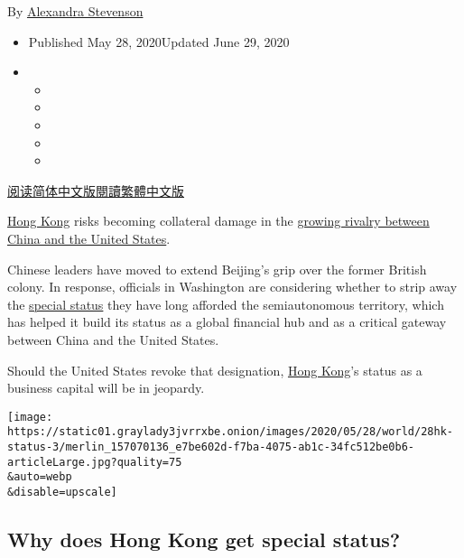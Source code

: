 By
\href{https://www.nytimes3xbfgragh.onion/by/alexandra-stevenson}{Alexandra
Stevenson}

\begin{itemize}
\item
  Published May 28, 2020Updated June 29, 2020
\item
  \begin{itemize}
  \item
  \item
  \item
  \item
  \item
  \end{itemize}
\end{itemize}

\href{https://cn.nytimes3xbfgragh.onion/business/20200529/hong-kong-special-status-explained/}{阅读简体中文版}\href{https://cn.nytimes3xbfgragh.onion/business/20200529/hong-kong-special-status-explained/zh-hant/}{閱讀繁體中文版}

\href{https://www.nytimes3xbfgragh.onion/2020/06/29/business/economy/us-halts-high-tech-exports-hong-kong.html}{Hong
Kong} risks becoming collateral damage in the
\href{https://www.nytimes3xbfgragh.onion/2020/05/28/world/asia/china-united-states.html}{growing
rivalry between China and the United States}.

Chinese leaders have moved to extend Beijing's grip over the former
British colony. In response, officials in Washington are considering
whether to strip away the
\href{https://hk.usconsulate.gov/our-relationship/policy-history/hkpa/}{special
status} they have long afforded the semiautonomous territory, which has
helped it build its status as a global financial hub and as a critical
gateway between China and the United States.

Should the United States revoke that designation,
\href{https://www.nytimes3xbfgragh.onion/2020/06/01/world/asia/Hong-kong-Tiananmen-vigil-banned.html}{Hong
Kong}'s status as a business capital will be in jeopardy.

\texttt{[image: https://static01.graylady3jvrrxbe.onion/images/2020/05/28/world/28hk-status-3/merlin\_157070136\_e7be602d-f7ba-4075-ab1c-34fc512be0b6-articleLarge.jpg?quality=75\\\&auto=webp\\\&disable=upscale]}

\hypertarget{why-does-hong-kong-get-special-status}{%
\subsection{Why does Hong Kong get special
status?}\label{why-does-hong-kong-get-special-status}}

